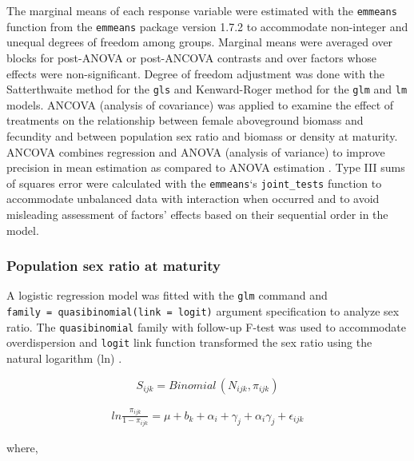 \documentclass[
]{article}
\begin{document}
The marginal means of each response variable were estimated with the \texttt{emmeans} function from the \texttt{emmeans} package version 1.7.2 \citep{lenthEmmeansEstimatedMarginal2021} to accommodate non-integer and unequal degrees of freedom among groups. Marginal means were averaged over blocks for post-ANOVA or post-ANCOVA contrasts and over factors whose effects were non-significant. Degree of freedom adjustment was done with the Satterthwaite method for the \texttt{gls} and Kenward-Roger method for the \texttt{glm} and \texttt{lm} models. ANCOVA (analysis of covariance) was applied to examine the effect of treatments on the relationship between female aboveground biomass and fecundity and between population sex ratio and biomass or density at maturity.
ANCOVA combines regression and ANOVA (analysis of variance) to improve precision in mean estimation as compared to ANOVA estimation \citep{yangAnalysisCovarianceAgronomy2011}. Type III sums of squares error were calculated with the \texttt{emmeans}`s \texttt{joint\_tests} function to accommodate unbalanced data with interaction when occurred and to avoid misleading assessment of factors' effects based on their sequential order in the model.

\hypertarget{population-sex-ratio-at-maturity}{%
\subsubsection*{Population sex ratio at maturity}\label{population-sex-ratio-at-maturity}}

A logistic regression model was fitted with the \texttt{glm} command and \texttt{family\ =\ quasibinomial(link\ =\ logit)} argument specification to analyze sex ratio. The \texttt{quasibinomial} family with follow-up F-test was used to accommodate overdispersion and \texttt{logit} link function transformed the sex ratio using the natural logarithm (ln) \citep{crawleyProportionData2013}.

\[ S_{ijk} = Binomial\,(N_{ijk},\pi_{ijk}) \]

\begin{align}
ln \frac{\pi_{ijk}}{1-\pi_{ijk}} = \mu + b_k + \alpha_i + \gamma_j +\alpha_i \gamma_j + \epsilon_{ijk} \label{eq:sex-mature}
\end{align}

where,
\end{document}
